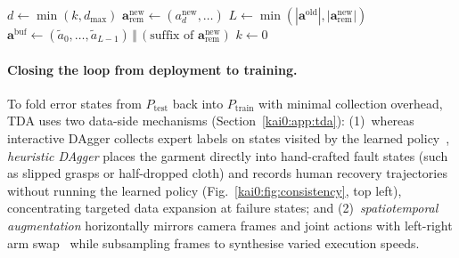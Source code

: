 \begin{algorithm}[tb]
  \caption{Temporal chunk-wise smoothing}\label{kai0:alg:chunk_smoothing}\label{kai0:alg:smoothing}
  $d \leftarrow \min(k, d_{\max})$
  $\mathbf{a}^{\mathrm{new}}_{\mathrm{rem}} \leftarrow (a^{\mathrm{new}}_{d}, \dots)$
  $L \leftarrow \min(|\mathbf{a}^{\mathrm{old}}|, |\mathbf{a}^{\mathrm{new}}_{\mathrm{rem}}|)$
  $\mathbf{a}^{\mathrm{buf}} \leftarrow (\tilde{a}_0, \dots, \tilde{a}_{L-1}) \,\Vert\, (\text{suffix of } \mathbf{a}^{\mathrm{new}}_{\mathrm{rem}})$\;
  $k \leftarrow 0$
  \;
\end{algorithm}

\paragraph{Closing the loop from deployment to training.} To fold error states from $P_{\mathrm{test}}$ back into $P_{\mathrm{train}}$ with minimal collection overhead, TDA uses two data-side mechanisms (Section~\ref{kai0:app:tda}): (1)~whereas interactive DAgger collects expert labels on states visited by the learned policy~\cite{ross2011dagger,kelly2019hgdagger}, \emph{heuristic DAgger} places the garment directly into hand-crafted fault states (such as slipped grasps or half-dropped cloth) and records human recovery trajectories without running the learned policy (Fig.~\ref{kai0:fig:consistency}, top left), concentrating targeted data expansion at failure states; and (2)~\emph{spatiotemporal augmentation} horizontally mirrors camera frames and joint actions with left-right arm swap~\cite{li2025gr} while subsampling frames to synthesise varied execution speeds.

